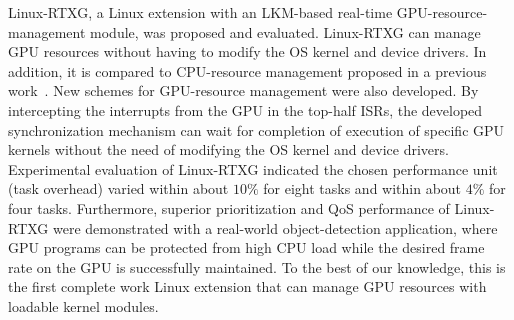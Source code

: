 \label{sec:conclusion}
Linux-RTXG, a Linux extension with an LKM-based real-time GPU-resource-management module, was proposed and evaluated.
Linux-RTXG can manage GPU resources without having to modify the OS kernel and device drivers.
In addition, it is compared to CPU-resource management proposed in a previous work~\cite{kato2009loadable, asberg2012exsched}.
New schemes for GPU-resource management were also developed.
By intercepting the interrupts from the GPU in the top-half ISRs, the developed synchronization mechanism can wait for completion of execution of specific GPU kernels without the need of modifying the OS kernel and device drivers.
Experimental evaluation of Linux-RTXG indicated the chosen performance unit (task overhead) varied within about $10\%$ for eight tasks and within about $4\%$ for four tasks.
Furthermore, superior prioritization and QoS performance of Linux-RTXG were demonstrated with a real-world object-detection application, where GPU programs can be protected from high CPU load while the desired frame rate on the GPU is successfully maintained.
To the best of our knowledge, this is the first complete work Linux extension that can manage GPU resources with loadable kernel modules.
